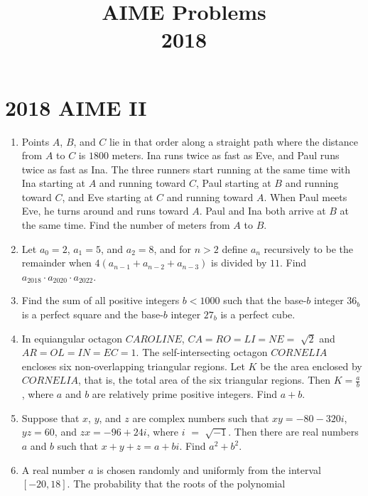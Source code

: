 \documentclass{article}
\title{AIME Problems \\ 2018}
\date{}
\begin{document}
\maketitle\thispagestyle{fancy}\newpage\section*{2018 AIME II}\begin{enumerate}[label=\arabic*., itemsep=0.5em]\item Points \(A\), \(B\), and \(C\) lie in that order along a straight path where the distance from \(A\) to \(C\) is \(1800\) meters. Ina runs twice as fast as Eve, and Paul runs twice as fast as Ina. The three runners start running at the same time with Ina starting at \(A\) and running toward \(C\), Paul starting at \(B\) and running toward \(C\), and Eve starting at \(C\) and running toward \(A\). When Paul meets Eve, he turns around and runs toward \(A\). Paul and Ina both arrive at \(B\) at the same time. Find the number of meters from \(A\) to \(B\).\par \vspace{0.5em}\item Let \(a_{0} = 2\), \(a_{1} = 5\), and \(a_{2} = 8\), and for \(n > 2\) define \(a_{n}\) recursively to be the remainder when \(4(a_{n-1} + a_{n-2} + a_{n-3})\) is divided by \(11\). Find \(a_{2018} \cdot a_{2020} \cdot a_{2022}\).\par \vspace{0.5em}\item Find the sum of all positive integers \(b < 1000\) such that the base-\(b\) integer \(36_{b}\) is a perfect square and the base-\(b\) integer \(27_{b}\) is a perfect cube.\par \vspace{0.5em}\item In equiangular octagon \(CAROLINE\), \(CA = RO = LI = NE =\) \(\sqrt{2}\) and \(AR = OL = IN = EC = 1\). The self-intersecting octagon \(CORNELIA\) encloses six non-overlapping triangular regions. Let \(K\) be the area enclosed by \(CORNELIA\), that is, the total area of the six triangular regions. Then \(K = \frac{a}{b}\), where \(a\) and \(b\) are relatively prime positive integers. Find \(a + b\).\par \vspace{0.5em}\item Suppose that \(x\), \(y\), and \(z\) are complex numbers such that \(xy = -80 - 320i\), \(yz = 60\), and \(zx = -96 + 24i\), where \(i\) \(=\) \(\sqrt{-1}\). Then there are real numbers \(a\) and \(b\) such that \(x + y + z = a + bi\). Find \(a^2 + b^2\).\par \vspace{0.5em}\item A real number \(a\) is chosen randomly and uniformly from the interval \([-20, 18]\). The probability that the roots of the polynomial



\end{enumerate}
\end{document}
